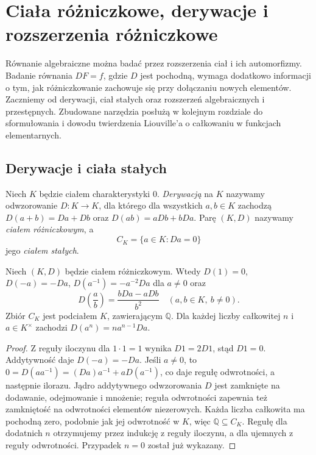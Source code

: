 \chapter{Ciała różniczkowe, derywacje i rozszerzenia różniczkowe}
\label{aa:ch:differential-fields}

Równanie algebraiczne można badać przez rozszerzenia ciał i ich
automorfizmy. Badanie równania $DF=f$, gdzie $D$ jest pochodną,
wymaga dodatkowo informacji o tym, jak różniczkowanie zachowuje się
przy dołączaniu nowych elementów. Zaczniemy od derywacji, ciał
stałych oraz rozszerzeń algebraicznych i przestępnych. Zbudowane
narzędzia posłużą w kolejnym rozdziale do sformułowania i dowodu
twierdzenia Liouville'a o całkowaniu w funkcjach elementarnych.

\section{Derywacje i ciała stałych}

\begin{definicja}
\label{aa:def:differential-field}
Niech $K$ będzie ciałem charakterystyki $0$.
\emph{Derywacją} na $K$ nazywamy odwzorowanie $D:K\to K$,
dla którego dla wszystkich $a,b\in K$ zachodzą
$D(a+b)=Da+Db$ oraz $D(ab)=aDb+bDa$.
Parę $(K,D)$ nazywamy \emph{ciałem różniczkowym}, a
\[
C_K=\{a\in K:Da=0\}
\]
jego \emph{ciałem stałych}.
\end{definicja}

\begin{stwierdzenie}
\label{aa:st:differential-field-rules}
Niech $(K,D)$ będzie ciałem różniczkowym. Wtedy
$D(1)=0$, $D(-a)=-Da$, $D(a^{-1})=-a^{-2}Da$
dla $a\ne0$ oraz
\[
D\!\left(\frac ab\right)=\frac{bDa-aDb}{b^2}
\quad(a,b\in K,\ b\ne0).
\]
Zbiór $C_K$ jest podciałem $K$, zawierającym $\mathbb Q$.
Dla każdej liczby całkowitej $n$ i $a\in K^\times$
zachodzi $D(a^n)=na^{n-1}Da$.
\end{stwierdzenie}
\begin{proof}
Z reguły iloczynu dla $1\cdot1=1$ wynika
$D1=2D1$, stąd $D1=0$. Addytywność daje
$D(-a)=-Da$. Jeśli $a\ne0$, to
$0=D(aa^{-1})=(Da)a^{-1}+aD(a^{-1})$,
co daje regułę odwrotności, a następnie ilorazu.
Jądro addytywnego odwzorowania $D$ jest zamknięte
na dodawanie, odejmowanie i mnożenie; reguła
odwrotności zapewnia też zamkniętość na odwrotności
elementów niezerowych. Każda liczba całkowita ma
pochodną zero, podobnie jak jej odwrotność w $K$,
więc $\mathbb Q\subseteq C_K$.
Regułę dla dodatnich $n$ otrzymujemy przez indukcję
z reguły iloczynu, a dla ujemnych z reguły
odwrotności. Przypadek $n=0$ został już wykazany.
\end{proof}

